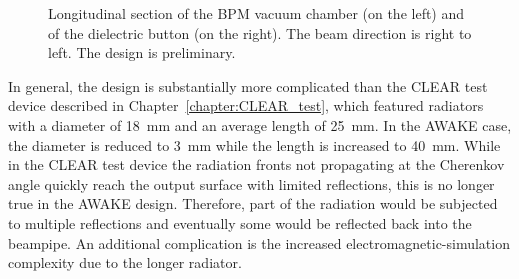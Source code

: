 \begin{figure}[!b]
\centering
{}
\hspace{3mm}
\caption{Longitudinal section of the BPM vacuum chamber (on the left) and of the dielectric button (on the right). The beam direction is right to left. The design is preliminary.}
\label{fig:body_button}
\end{figure}

In general, the design is substantially more complicated than the CLEAR test device described in Chapter~\ref{chapter:CLEAR_test}, which featured radiators with a diameter of 18~mm and an average length of 25~mm. In the AWAKE case, the diameter is reduced to 3~mm while the length is increased to 40~mm. While in the CLEAR test device the radiation fronts not propagating at the Cherenkov angle quickly reach the output surface with limited reflections, this is no longer true in the AWAKE design. Therefore, part of the radiation would be subjected to multiple reflections and eventually some would be reflected back into the beampipe. An additional complication is the increased electromagnetic-simulation complexity due to the longer radiator.








